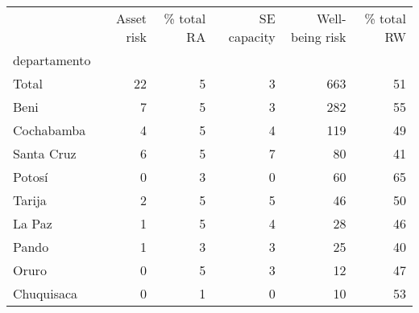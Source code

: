 \begin{tabular}{lrrrrr}
\toprule
{} &  Asset risk &  \% total RA &  SE capacity &  Well-being risk &  \% total RW \\
departamento &             &             &              &                  &             \\
\midrule
Total        &          22 &           5 &            3 &              663 &          51 \\
Beni         &           7 &           5 &            3 &              282 &          55 \\
Cochabamba   &           4 &           5 &            4 &              119 &          49 \\
Santa Cruz   &           6 &           5 &            7 &               80 &          41 \\
Potosí       &           0 &           3 &            0 &               60 &          65 \\
Tarija       &           2 &           5 &            5 &               46 &          50 \\
La Paz       &           1 &           5 &            4 &               28 &          46 \\
Pando        &           1 &           3 &            3 &               25 &          40 \\
Oruro        &           0 &           5 &            3 &               12 &          47 \\
Chuquisaca   &           0 &           1 &            0 &               10 &          53 \\
\bottomrule
\end{tabular}
